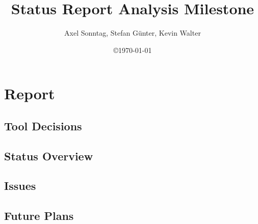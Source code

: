 \documentclass[a4paper,12pt]{scrartcl}[1970/01/01]
\title{Status Report Analysis Milestone}
\author{Axel Sonntag, Stefan Günter, Kevin Walter}
\date{\copyright\space\today}
\begin{document}
\maketitle
\newpage

\tableofcontents
\newpage


\section{Report}
\subsection{Tool Decisions}


\subsection{Status Overview}


\subsection{Issues}


\subsection{Future Plans}

\end{document}
